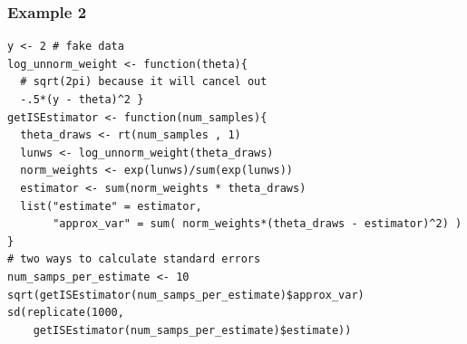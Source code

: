 \documentclass{beamer}
\begin{document}
\begin{frame}[fragile]
\frametitle{Example 2}

\begin{verbatim}
y <- 2 # fake data
log_unnorm_weight <- function(theta){ 
  # sqrt(2pi) because it will cancel out 
  -.5*(y - theta)^2 }
getISEstimator <- function(num_samples){
  theta_draws <- rt(num_samples , 1)
  lunws <- log_unnorm_weight(theta_draws)
  norm_weights <- exp(lunws)/sum(exp(lunws))
  estimator <- sum(norm_weights * theta_draws)
  list("estimate" = estimator, 
       "approx_var" = sum( norm_weights*(theta_draws - estimator)^2) ) }
# two ways to calculate standard errors
num_samps_per_estimate <- 10
sqrt(getISEstimator(num_samps_per_estimate)$approx_var)  
sd(replicate(1000, 
    getISEstimator(num_samps_per_estimate)$estimate)) 
\end{verbatim}


\end{frame}
\end{document}
